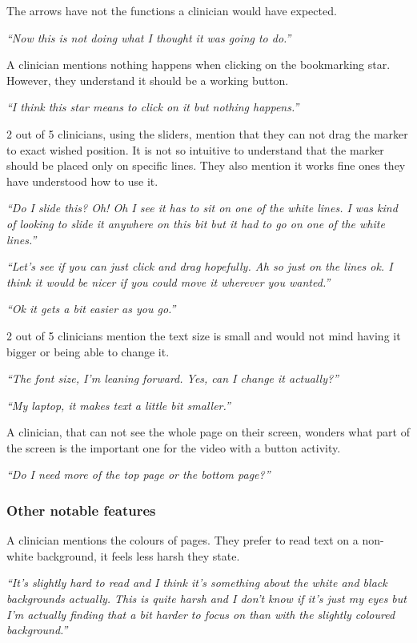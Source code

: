\documentclass{sigchi}
\begin{document}
The arrows have not the functions a clinician would have expected.

\textit{“Now this is not doing what I thought it was going to do.”}

A clinician mentions nothing happens when clicking on the bookmarking star. However, they understand it should be a working button.

\textit{“I think this star means to click on it but nothing happens.”}

2 out of 5 clinicians, using the sliders, mention that they can not drag the marker to exact wished position. It is not so intuitive to understand that the marker should be placed only on specific lines. They also mention it works fine ones they have understood how to use it.

\textit{“Do I slide this? Oh! Oh I see it has to sit on one of the white lines. I was kind of looking to slide it anywhere on this bit but it had to go on one of the white lines.”}

\textit{“Let’s see if you can just click and drag hopefully. Ah so just on the lines ok. I think it would be nicer if you could move it wherever you wanted.”}

\textit{“Ok it gets a bit easier as you go.”}

2 out of 5 clinicians mention the text size is small and would not mind having it bigger or being able to change it.

\textit{“The font size, I’m leaning forward. Yes, can I change it actually?”}

\textit{“My laptop, it makes text a little bit smaller.”}

A clinician, that can not see the whole page on their screen, wonders what part of the screen is the important one for the video with a button activity.

\textit{“Do I need more of the top page or the bottom page?”}

\subsubsection{Other notable features}
A clinician mentions the colours of pages. They prefer to read text on a non-white background, it feels less harsh they state.

\textit{“It’s slightly hard to read and I think it’s something about the white and black backgrounds actually. This is quite harsh and I don’t know if it’s just my eyes but I’m actually finding that a bit harder to focus on than with the slightly coloured background.”}
\end{document}
